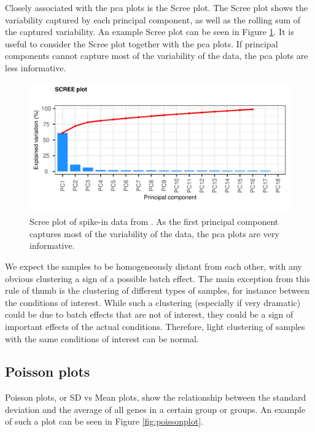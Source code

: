 Closely associated with the \gls{pca} plots is the Scree plot. The Scree plot shows the variability captured by each principal component, as well as the rolling sum of the captured variability. An example Scree plot can be seen in Figure \ref{fig:Scree}. It is useful to consider the Scree plot together with the \gls{pca} plots. If principal components cannot capture most of the variability of the data, the \gls{pca} plots are less informative.

\begin{figure}
    \centering
    \includegraphics{resources/images/5_Scree Plot - original.pdf}
    \caption{Scree plot of spike-in data from \textcite{zhuPreferredAnalysisMethods2010}. As the first principal component captures most of the variability of the data, the \gls{pca} plots are very informative.}
    \label{fig:Scree}
\end{figure}

We expect the samples to be homogeneously distant from each other, with any obvious clustering a sign of a possible batch effect. The main exception from this rule of thumb is the clustering of different types of samples, for instance between the conditions of interest. While such a clustering (especially if very dramatic) could be due to batch effects that are not of interest, they could be a sign of important effects of the actual conditions. Therefore, light clustering of samples with the same conditions of interest can be normal.

\subsection{Poisson plots}
Poisson plots, or SD vs Mean plots, show the relationship between the standard deviation and the average of all genes in a certain group or groups. An example of such a plot can be seen in Figure \ref{fig:poissonplot}.

